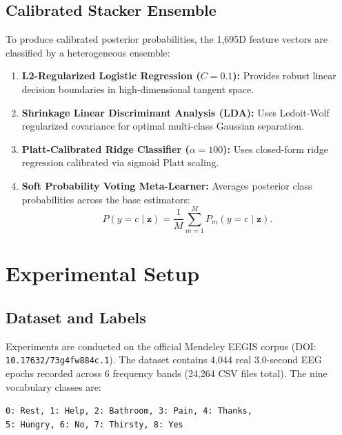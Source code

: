 \documentclass[10pt,twocolumn,a4paper]{article}
\begin{document}
\subsection{Calibrated Stacker Ensemble}
To produce calibrated posterior probabilities, the 1,695D feature vectors are classified by a heterogeneous ensemble:
\begin{enumerate}
    \item \textbf{L2-Regularized Logistic Regression ($C=0.1$):} Provides robust linear decision boundaries in high-dimensional tangent space.
    \item \textbf{Shrinkage Linear Discriminant Analysis (LDA):} Uses Ledoit-Wolf regularized covariance for optimal multi-class Gaussian separation.
    \item \textbf{Platt-Calibrated Ridge Classifier ($\alpha=100$):} Uses closed-form ridge regression calibrated via sigmoid Platt scaling.
    \item \textbf{Soft Probability Voting Meta-Learner:} Averages posterior class probabilities across the base estimators:
    \begin{equation}
    P(y = c \mid \mathbf{z}) = \frac{1}{M} \sum_{m=1}^M P_m(y = c \mid \mathbf{z}).
    \label{eq:soft_vote}
    \end{equation}
\end{enumerate}

\section{Experimental Setup}

\subsection{Dataset and Labels}
Experiments are conducted on the official Mendeley EEGIS corpus \cite{mendeley_eegis_2025} (DOI: \texttt{10.17632/73g4fw884c.1}). The dataset contains 4,044 real 3.0-second EEG epochs recorded across 6 frequency bands (24,264 CSV files total). The nine vocabulary classes are:
\begin{center}
\texttt{0: Rest, 1: Help, 2: Bathroom, 3: Pain, 4: Thanks,} \\
\texttt{5: Hungry, 6: No, 7: Thirsty, 8: Yes}
\end{center}
\end{document}
